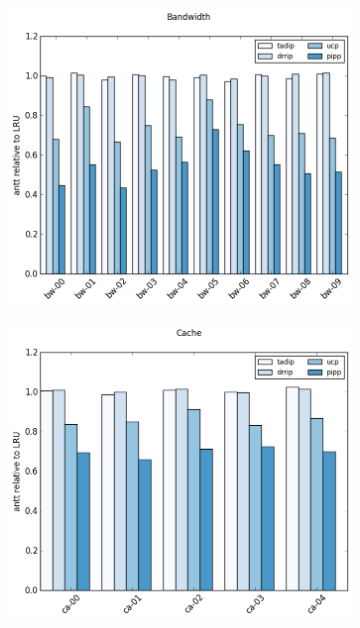 \begin{figure}[ht]
        \centering
        \begin{subfigure}[b]{0.5\textwidth}
                \includegraphics[width=\textwidth]{../experiments/archives/02-algorithm-test/_figures/speedup/antt-bw.png}
                \label{fig:processor_model:sensitivity:ol}
        \end{subfigure}%
        \begin{subfigure}[b]{0.5\textwidth}
                \includegraphics[width=\textwidth]{../experiments/archives/02-algorithm-test/_figures/speedup/antt-ca.png}

\end{subfigure}
\end{figure}
